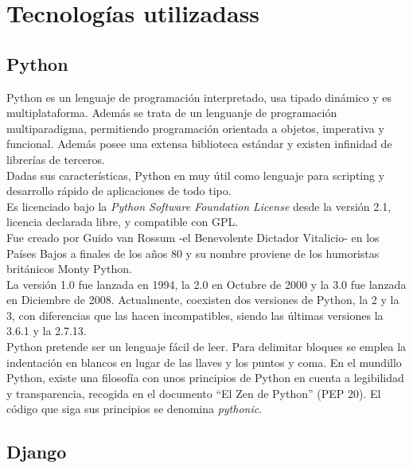 \section{Tecnologías utilizadass} 
\label{sec:tec_use}

\subsection{Python} 
\label{sec:python}


Python es un lenguaje de programación interpretado, usa tipado dinámico y es multiplataforma. Además se trata de un lenguanje de programación multiparadigma, permitiendo programación orientada a objetos, imperativa y funcional. Además posee una extensa biblioteca estándar y existen infinidad de librerías de terceros.\\


Dadas sus características, Python en muy útil como lenguaje para scripting y desarrollo rápido de aplicaciones de todo tipo.\\


Es licenciado bajo la \textit{Python Software Foundation License} desde la versión 2.1, licencia declarada libre, y compatible con GPL.\\


Fue creado por Guido van Rossum -el Benevolente Dictador Vitalicio- en los Países Bajos a finales de los años 80 y su nombre proviene de los humoristas británicos Monty Python.\\


La versión 1.0 fue lanzada en 1994, la 2.0 en Octubre de 2000 y la 3.0 fue lanzada en Diciembre de 2008. Actualmente, coexisten dos versiones de Python, la 2 y la 3, con diferencias que las hacen incompatibles, siendo las últimas versiones la 3.6.1 y la 2.7.13.\\


Python pretende ser un lenguaje fácil de leer. Para delimitar bloques se emplea la indentación en blancos en lugar de las llaves y los puntos y coma. En el mundillo Python, existe una filosofía  con unos principios de Python en cuenta a legibilidad y transparencia, recogida en el documento ``El Zen de Python'' (PEP 20). El código que siga sus principios se denomina \textit{pythonic}.


\subsection{Django} 
\label{sec:django}


